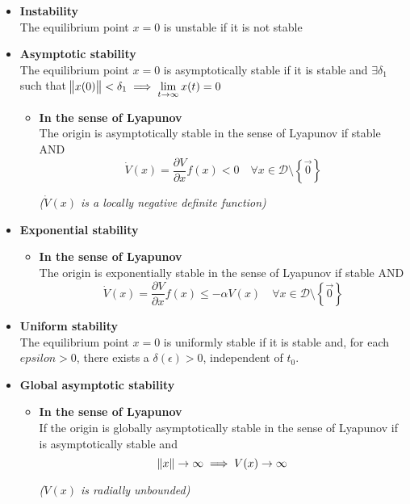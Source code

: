 {\begin{itemize}
    
    \item \textbf{Instability}\\
    The equilibrium point $x=0$ is unstable if it is not stable
    
    
    \item \textbf{Asymptotic stability}\\
    The equilibrium point $x=0$ is asymptotically stable if it is stable and $\exists \delta_1$ such that $\norm{x(0)}<\delta_1 \implies \lim\limits_{t\rightarrow\infty}x(t)=0$

    \begin{itemize}
        \item \textbf{In the sense of Lyapunov}\\
        The origin is asymptotically stable in the sense of Lyapunov if stable AND
        \[\dot{V}(x)=\frac{\partial V}{\partial x} f(x) < 0 \quad \forall x \in \mathcal{D}\setminus\left\{\Vec{0}\right\}\]
        \begin{center}
            \textit{($\dot{V}(x)$ is a locally negative definite function)}
        \end{center}
    \end{itemize}
    
    \item \textbf{Exponential stability}\\  
    \begin{itemize}
        \item \textbf{In the sense of Lyapunov}\\
        The origin is exponentially stable in the sense of Lyapunov if stable AND
        \[\dot{V}(x)=\frac{\partial V}{\partial x} f(x) \leq -\alpha V(x) \quad \forall x \in \mathcal{D}\setminus\left\{\Vec{0}\right\}\]
    \end{itemize}
    
    \item \textbf{Uniform stability}\\
    The equilibrium point $x=0$ is uniformly stable if it is stable and, for each $epsilon>0$, there exists a $\delta(\epsilon)>0$, independent of $t_0$.
    
    \item \textbf{Global asymptotic stability}\\
    \begin{itemize}
        \item \textbf{In the sense of Lyapunov}\\
        If the origin is globally asymptotically stable in the sense of Lyapunov if is asymptotically stable and 
        \[\norm{x}\rightarrow\infty \implies V(x)\rightarrow\infty\]
        \begin{center}
            \textit{($V(x)$ is radially unbounded)}
        \end{center}
    \end{itemize}
    

\end{itemize}}
